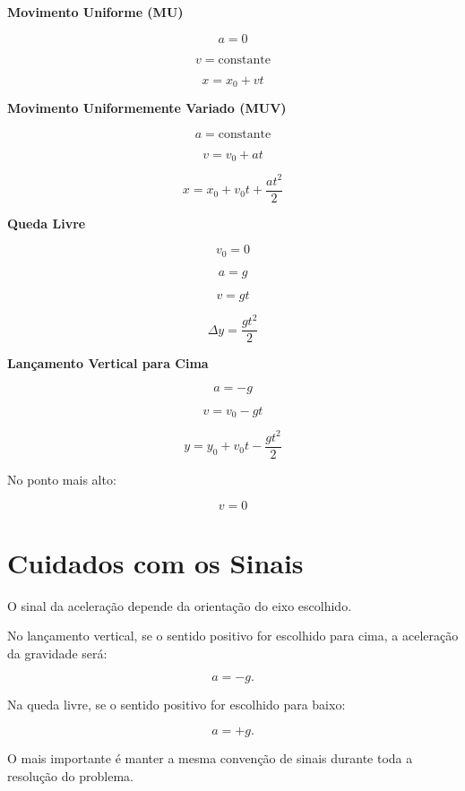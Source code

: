 \documentclass[a4paper,12pt]{article}
\begin{document}
\begin{ideia}

\textbf{Movimento Uniforme (MU)}

\[
a=0
\]

\[
v=\text{constante}
\]

\[
x=x_0+vt
\]

\vspace{0.3cm}

\textbf{Movimento Uniformemente Variado (MUV)}

\[
a=\text{constante}
\]

\[
v=v_0+at
\]

\[
x=x_0+v_0t+\frac{at^2}{2}
\]

\vspace{0.3cm}

\textbf{Queda Livre}

\[
v_0=0
\]

\[
a=g
\]

\[
v=gt
\]

\[
\Delta y=\frac{gt^2}{2}
\]

\vspace{0.3cm}

\textbf{Lançamento Vertical para Cima}

\[
a=-g
\]

\[
v=v_0-gt
\]

\[
y=y_0+v_0t-\frac{gt^2}{2}
\]

No ponto mais alto:

\[
v=0
\]

\end{ideia}


\section{Cuidados com os Sinais}

\begin{atencao}

O sinal da aceleração depende da orientação do eixo escolhido.

No lançamento vertical, se o sentido positivo for escolhido para cima,
a aceleração da gravidade será:

\[
a=-g.
\]

Na queda livre, se o sentido positivo for escolhido para baixo:

\[
a=+g.
\]

O mais importante é manter a mesma convenção de sinais durante toda
a resolução do problema.

\end{atencao}
\end{document}

